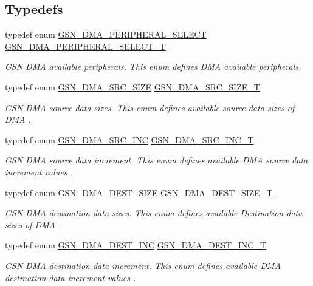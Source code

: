 \subsection*{Typedefs}
\begin{DoxyCompactItemize}
\item 
typedef enum \hyperlink{a00645_ga6b06d19717ade6dfd815a84e83d2388c}{GSN\_\-DMA\_\-PERIPHERAL\_\-SELECT} \hyperlink{a00645_gab17cf1a2935d52f5490128aeddd1eb07}{GSN\_\-DMA\_\-PERIPHERAL\_\-SELECT\_\-T}
\begin{DoxyCompactList}\small\item\em GSN DMA available peripherals. This enum defines DMA available peripherals. \end{DoxyCompactList}\item 
typedef enum \hyperlink{a00645_ga5ae8eaac9f901eb2607d04c46b8141e9}{GSN\_\-DMA\_\-SRC\_\-SIZE} \hyperlink{a00645_ga30dffcfe8e6fc270f93048d90cd440ec}{GSN\_\-DMA\_\-SRC\_\-SIZE\_\-T}
\begin{DoxyCompactList}\small\item\em GSN DMA source data sizes. This enum defines available source data sizes of DMA . \end{DoxyCompactList}\item 
typedef enum \hyperlink{a00645_ga592093c11bfd36ebbe08e1446e26f37a}{GSN\_\-DMA\_\-SRC\_\-INC} \hyperlink{a00645_gadfad5571e188cca605e051802c24ada0}{GSN\_\-DMA\_\-SRC\_\-INC\_\-T}
\begin{DoxyCompactList}\small\item\em GSN DMA source data increment. This enum defines available DMA source data increment values . \end{DoxyCompactList}\item 
typedef enum \hyperlink{a00645_gab66304fcaa89e7d7dd7d514eb086c56c}{GSN\_\-DMA\_\-DEST\_\-SIZE} \hyperlink{a00645_ga911fde9b2a20ed7759a9d2a8849e34f4}{GSN\_\-DMA\_\-DEST\_\-SIZE\_\-T}
\begin{DoxyCompactList}\small\item\em GSN DMA destination data sizes. This enum defines available Destination data sizes of DMA . \end{DoxyCompactList}\item 
typedef enum \hyperlink{a00645_gaeec51ec6ddb024d9e8bb0c011cb167ef}{GSN\_\-DMA\_\-DEST\_\-INC} \hyperlink{a00645_gad729aa817bfd135b589e7c5d589c6c24}{GSN\_\-DMA\_\-DEST\_\-INC\_\-T}
\begin{DoxyCompactList}\small\item\em GSN DMA destination data increment. This enum defines available DMA destination data increment values . \end{DoxyCompactList}\item 

\end{DoxyCompactItemize}
